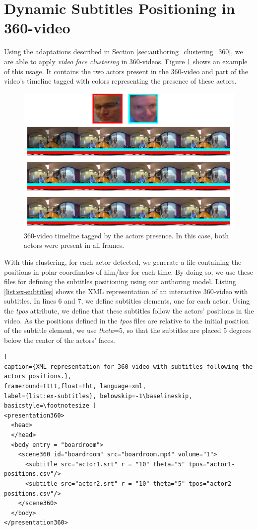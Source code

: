 \section{Dynamic Subtitles Positioning in 360-video}
\label{sec:authoring_discussion}

Using the adaptations described in Section \ref{sec:authoring_clustering_360}, we are able to apply \emph{video face clustering} in 360-videos. Figure \ref{fig:360_video_timeline} shows an example of this usage. It contains the two actors present in the 360-video and part of the video's timeline tagged with colors representing the presence of these actors.

\begin{figure}[!ht]
    \centering
    \includegraphics[width=0.8\linewidth]{img/video360/timeline-360.png}
    \caption{360-video timeline tagged by the actors presence. In this case, both actors were present in all frames.}
    \label{fig:360_video_timeline}
\end{figure}

With this clustering, for each actor detected, we generate a file containing the positions in polar coordinates of him/her for each time. By doing so, we use these files for defining the subtitles positioning using our authoring model. Listing \ref{list:ex-subtitles} shows the XML representation of an interactive 360-video with subtitles. In lines 6 and 7, we define subtitles elements, one for each actor. Using the \emph{tpos} attribute, we define that these subtitles follow the actors' positions in the video. As the positions defined in the \emph{tpos} files are relative to the initial position of the subtitle element, we use \emph{theta}=5, so that the subtitles are placed 5 degrees below the center of the actors' faces.


\begin{lstlisting}[
caption={XML representation for 360-video with subtitles following the actors positions.},
frameround=tttt,float=!ht, language=xml, 
label={list:ex-subtitles}, belowskip=-1\baselineskip, basicstyle=\footnotesize ]
<presentation360>
  <head>
  </head>
  <body entry = "boardroom">
    <scene360 id="boardroom" src="boardroom.mp4" volume="1">   
      <subtitle src="actor1.srt" r = "10" theta="5" tpos="actor1-positions.csv"/>      
      <subtitle src="actor2.srt" r = "10" theta="5" tpos="actor2-positions.csv"/>
    </scene360>
  </body>
</presentation360>
\end{lstlisting}

